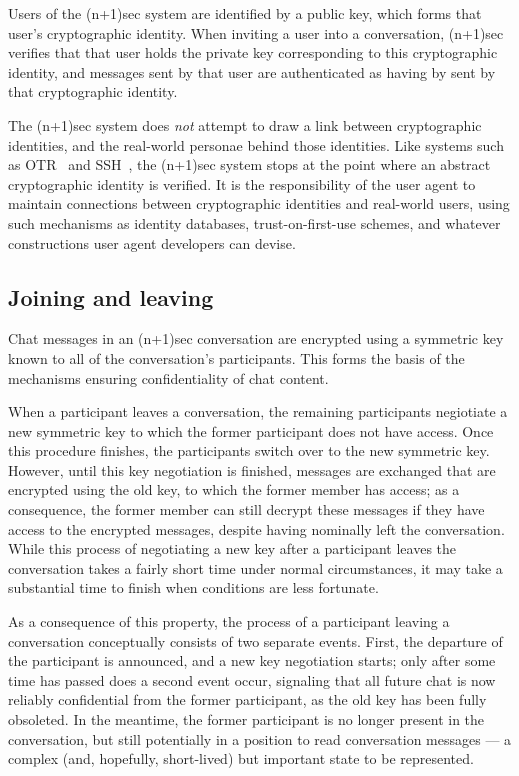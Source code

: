 \documentclass{article}
\begin{document}
Users of the (n+1)sec system are identified by a public key, which forms that user's cryptographic identity.
When inviting a user into a conversation, (n+1)sec verifies that that user holds the private key corresponding to this cryptographic identity, and messages sent by that user are authenticated as having by sent by that cryptographic identity.

The (n+1)sec system does \emph{not} attempt to draw a link between cryptographic identities, and the real-world personae behind those identities.
Like systems such as OTR~\cite{otr} and SSH~\cite{ssh}, the (n+1)sec system stops at the point where an abstract cryptographic identity is verified.
It is the responsibility of the user agent to maintain connections between cryptographic identities and real-world users, using such mechanisms as identity databases, trust-on-first-use schemes, and whatever constructions user agent developers can devise.


\subsection{Joining and leaving}
\label{sec:chat-model/joining-and-leaving}

Chat messages in an (n+1)sec conversation are encrypted using a symmetric key known to all of the conversation's participants.
This forms the basis of the mechanisms ensuring confidentiality of chat content.

When a participant leaves a conversation, the remaining participants negiotiate a new symmetric key to which the former participant does not have access.
Once this procedure finishes, the participants switch over to the new symmetric key.
However, until this key negotiation is finished, messages are exchanged that are encrypted using the old key, to which the former member has access; as a consequence, the former member can still decrypt these messages if they have access to the encrypted messages, despite having nominally left the conversation.
While this process of negotiating a new key after a participant leaves the conversation takes a fairly short time under normal circumstances, it may take a substantial time to finish when conditions are less fortunate.

As a consequence of this property, the process of a participant leaving a conversation conceptually consists of two separate events.
First, the departure of the participant is announced, and a new key negotiation starts; only after some time has passed does a second event occur, signaling that all future chat is now reliably confidential from the former participant, as the old key has been fully obsoleted.
In the meantime, the former participant is no longer present in the conversation, but still potentially in a position to read conversation messages --- a complex (and, hopefully, short-lived) but important state to be represented.
\end{document}
